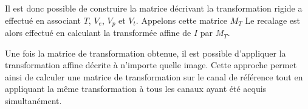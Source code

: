 \documentclass[\main/main.tex]{subfiles}
\begin{document}
%
Il est donc possible de construire la matrice décrivant la transformation rigide a effectué en associant $T$, $V_e$, $V_p$ et $V_t$.
%
Appelons cette matrice $M_T$
%
Le recalage est alors effectué en calculant la transformée affine de $I$ par $M_T$.

%
Une fois la matrice de transformation obtenue, il est possible d'appliquer la transformation affine décrite à n'importe quelle image.
%
Cette approche permet ainsi de calculer une matrice de transformation sur le canal de référence tout en appliquant la même transformation à tous les canaux ayant été acquis simultanément.
\end{document}

